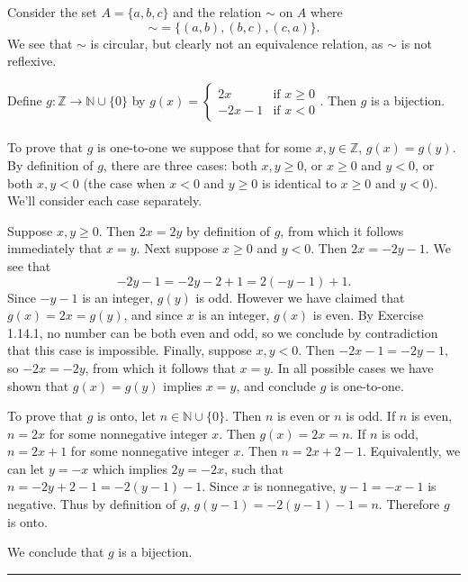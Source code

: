 \documentclass[11pt]{hmcpset}
\newenvironment{problem2}[1]{\noindent {\bf (#1}}
{\medskip}
\newenvironment{problem1}[1]{\noindent {\bf Problem #1}}
{\medskip}
\newenvironment{proof}{\noindent {\bf Proof:} \\}{\hfill
\rule{1mm}{3mm} \bigskip}
\begin{document}
\begin{problem2}{b)} Consider the set $A=\{a,b,c\}$ and the relation $\sim$ on $A$ where $$\sim=\{(a,b),(b,c),(c,a)\}.$$ We see that $\sim$ is circular, but clearly not an equivalence relation, as $\sim$ is not reflexive.

\end{problem2}

\begin{problem1}{4} Define $g:\mathbb{Z}\to\mathbb{N}\cup\{0\}$ by $g(x)=\begin{cases} 2x & \text{if $x\ge0$}\\ -2x-1 & \text{if $x<0$}\end{cases}$. Then $g$ is a bijection.\\
\begin{proof}\indent To prove that $g$ is one-to-one we suppose that for some $x,y\in \mathbb{Z}$, $g(x)=g(y)$. By definition of $g$, there are three cases: both $x,y\ge 0$, or $x\ge 0$ and $y< 0$, or both $x,y< 0$ (the case when $x<0$ and $y\ge 0$ is identical to $x\ge 0$ and $y<0$). We'll consider each case separately.

Suppose $x,y\ge 0$. Then $2x=2y$ by definition of $g$, from which it follows immediately that $x=y$. Next suppose $x\ge 0$ and $y<0$. Then $2x=-2y-1.$ We see that $$-2y-1=-2y-2+1=2(-y-1)+1.$$ Since $-y-1$ is an integer, $g(y)$ is odd. However we have claimed that $g(x)=2x=g(y)$, and since $x$ is an integer, $g(x)$ is even. By Exercise 1.14.1, no number can be both even and odd, so we conclude by contradiction that this case is impossible. Finally, suppose $x,y<0$. Then $-2x-1=-2y-1$, so $-2x=-2y$, from which it follows that $x=y$. In all possible cases we have shown that $g(x)=g(y)$ implies $x=y$, and conclude $g$ is one-to-one.

To prove that $g$ is onto, let $n\in\mathbb{N}\cup\{0\}$. Then $n$ is even or $n$ is odd. If $n$ is even, $n=2x$ for some nonnegative integer $x$. Then $g(x)=2x=n.$ If $n$ is odd, $n=2x+1$ for some nonnegative integer $x$. Then $n=2x+2-1$. Equivalently, we can let $y=-x$ which implies $2y=-2x$, such that $n=-2y+2-1=-2(y-1)-1.$ Since $x$ is nonnegative, $y-1=-x-1$ is negative. Thus by definition of $g$, $g(y-1)=-2(y-1)-1=n$. Therefore $g$ is onto.

We conclude that $g$ is a bijection.
\end{proof}
\end{problem1}
\end{document}
